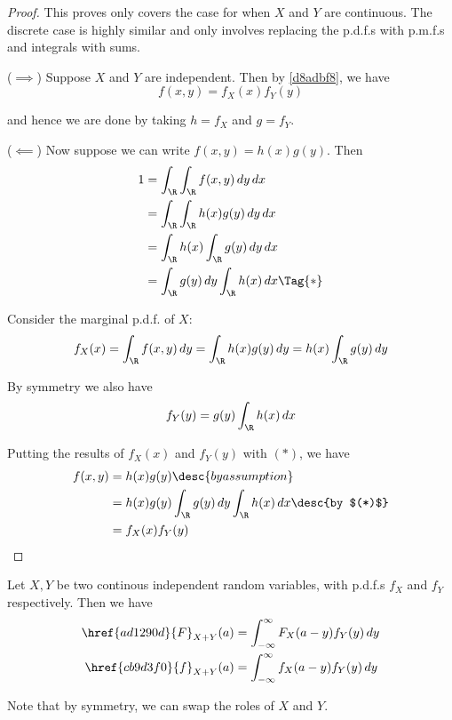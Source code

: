 \begin{proof}
  This proves only covers the case for when $X$ and $Y$ are continuous. The
  discrete case is highly similar and only involves replacing the p.d.f.s with
  p.m.f.s and integrals with sums.

  ($\implies$) Suppose $X$ and $Y$ are independent. Then by \autoref{d8adbf8},
  we have
  $$
    f(x,y)=f_X(x)f_Y(y)
  $$

  and hence we are done by taking $h=f_X$ and $g=f_Y$.

  ($\impliedby$) Now suppose we can write $f(x,y)=h(x)g(y)$. Then
  \begin{align*}
    1 &=\int_\R\int_\R f(x,y)\,dy\,dx           \\
      &=\int_\R\int_\R h(x)g(y)\,dy\,dx         \\
      &=\int_\R h(x)\int_\R g(y)\,dy\,dx        \\
      &=\int_\R g(y)\,dy\int_\R h(x)\,dx\Tag{*}
  \end{align*}

  Consider the marginal p.d.f. of $X$:
  $$
    f_X(x)
    =\int_\R f(x,y)\,dy
    =\int_\R h(x)g(y)\,dy
    =h(x)\int_\R g(y)\,dy
  $$

  By symmetry we also have
  $$
    f_Y(y)=g(y)\int_\R h(x)\,dx
  $$

  Putting the results of $f_X(x)$ and $f_Y(y)$ with $(*)$, we have
  \begin{align*}
    f(x,y) &=h(x)g(y)\desc{by assumption}                            \\
           &=h(x)g(y)\int_\R g(y)\,dy\int_\R h(x)\,dx\desc{by $(*)$} \\
           &=f_X(x)f_Y(y)
  \end{align*}
\end{proof}

\label{d671a9d}

Let $X,Y$ be two continous independent random variables, with p.d.f.s $f_X$ and
$f_Y$ respectively. Then we have
\begin{align*}
  \href{ad1290d}{F}_{X+Y}(a) &=\int_{-\infty}^\infty F_X(a-y)f_Y(y)\,dy \\
  \href{cb9d3f0}{f}_{X+Y}(a) &=\int_{-\infty}^\infty f_X(a-y)f_Y(y)\,dy
\end{align*}

Note that by symmetry, we can swap the roles of $X$ and $Y$.

